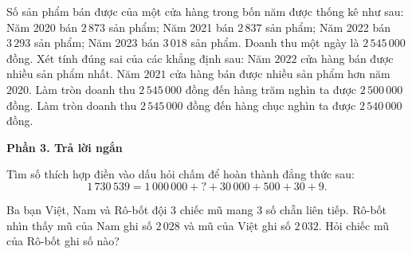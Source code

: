 \begin{ex} %
Số sản phẩm bán được của một cửa hàng trong bốn năm được thống kê như sau: Năm 2020 bán $2\,873$ sản phẩm; Năm 2021 bán $2\,837$ sản phẩm; Năm 2022 bán $3\,293$ sản phẩm; Năm 2023 bán $3\,018$ sản phẩm. Doanh thu một ngày là $2\,545\,000$ đồng. Xét tính đúng sai của các khẳng định sau:
\choiceTF
{\True Năm $2022$ cửa hàng bán được nhiều sản phẩm nhất.}
{Năm $2021$ cửa hàng bán được nhiều sản phẩm hơn năm $2020$.}
{\True Làm tròn doanh thu $2\,545\,000$ đồng đến hàng trăm nghìn ta được $2\,500\,000$ đồng.}
{Làm tròn doanh thu $2\,545\,000$ đồng đến hàng chục nghìn ta được $2\,540\,000$ đồng.}
\end{ex}

\textbf{Phần 3. Trả lời ngắn}

\begin{ex} %
Tìm số thích hợp điền vào dấu hỏi chấm để hoàn thành đẳng thức sau:
\[
1\,730\,539 = 1\,000\,000 + ? + 30\,000 + 500 + 30 + 9.
\]
\end{ex}

\begin{ex} %
Ba bạn Việt, Nam và Rô-bốt đội $3$ chiếc mũ mang $3$ số chẵn liên tiếp. Rô-bốt nhìn thấy mũ của Nam ghi số $2\,028$ và mũ của Việt ghi số $2\,032$. Hỏi chiếc mũ của Rô-bốt ghi số nào?
\end{ex}

